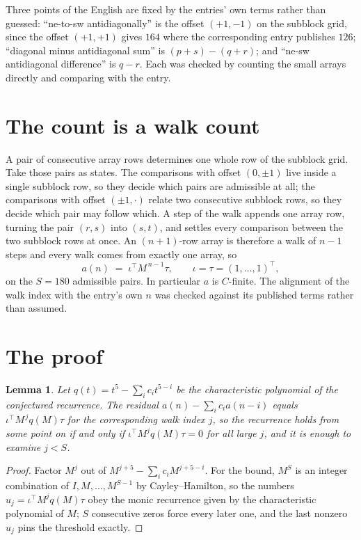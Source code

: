 \documentclass[11pt,a4paper]{article}
\theoremstyle{plain}
\newtheorem{lemma}[theorem]{Lemma}
\theoremstyle{definition}
\begin{document}
Three points of the English are fixed by the entries' own terms rather than guessed:
``ne-to-sw antidiagonally'' is the offset $(+1,-1)$ on the subblock grid, since the offset
$(+1,+1)$ gives $164$ where the corresponding entry publishes $126$; ``diagonal minus
antidiagonal sum'' is $(p+s)-(q+r)$; and ``ne-sw antidiagonal difference'' is $q-r$. Each was
checked by counting the small arrays directly and comparing with the entry.

\section{The count is a walk count}

A pair of consecutive array rows determines one whole row of the subblock grid. Take those
pairs as states. The comparisons with offset $(0,\pm1)$ live inside a single subblock row, so
they decide which pairs are admissible at all; the comparisons with offset $(\pm1,\cdot)$
relate two consecutive subblock rows, so they decide which pair may follow which. A step of the
walk appends one array row, turning the pair $(r,s)$ into $(s,t)$, and settles every comparison
between the two subblock rows at once. An $(n+1)$-row array is therefore a walk of $n-1$ steps
and every walk comes from exactly one array, so
\[
a(n)\;=\;\iota^{\!\top}M^{\,n-1}\tau,\qquad \iota=\tau=(1,\dots,1)^{\!\top},
\]
on the $S=180$ admissible pairs. In particular $a$ is $C$-finite. The alignment of the walk
index with the entry's own $n$ was checked against its published terms rather than assumed.

\section{The proof}

\begin{lemma}\label{lem:crit}
Let $q(t)=t^{5}-\sum_i c_it^{5-i}$ be the characteristic polynomial of the
conjectured recurrence. The residual $a(n)-\sum_ic_ia(n-i)$ equals
$\iota^{\!\top}M^{\,j}q(M)\tau$ for the corresponding walk index $j$, so the recurrence
holds from some point on if and only if $\iota^{\!\top}M^{j}q(M)\tau=0$ for all large $j$,
and it is enough to examine $j<S$.
\end{lemma}

\begin{proof}
Factor $M^{j}$ out of $M^{j+5}-\sum_ic_iM^{j+5-i}$. For the bound, $M^{S}$
is an integer combination of $I,M,\dots,M^{S-1}$ by Cayley--Hamilton, so the numbers
$u_j=\iota^{\!\top}M^{j}q(M)\tau$ obey the monic recurrence given by the characteristic
polynomial of $M$; $S$ consecutive zeros force every later one, and the last nonzero $u_j$
pins the threshold exactly.
\end{proof}
\end{document}
